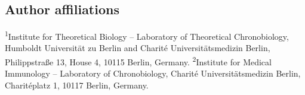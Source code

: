 \subsection*{Author affiliations}
\textsuperscript{1}Institute for Theoretical Biology -- Laboratory of Theoretical Chronobiology, Humboldt Universit\"at zu Berlin and Charit\'e Universit\"atsmedizin Berlin, Philippstra\ss e 13, House 4, 10115 Berlin, Germany. \textsuperscript{2}Institute for Medical Immunology -- Laboratory of Chronobiology, Charité Universitätsmedizin Berlin, Charitéplatz 1, 10117 Berlin, Germany. 